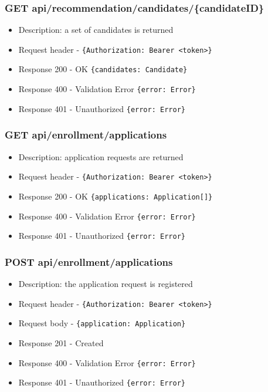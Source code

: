 \subsubsection{GET api/recommendation/candidates/\{candidateID\}}
\begin{itemize}
    \item Description: a set of candidates is returned
    \item Request header - \verb|{Authorization: Bearer <token>}|
    \item Response 200 - OK \verb|{candidates: Candidate}|
    \item Response 400 - Validation Error \verb|{error: Error}|
    \item Response 401 - Unauthorized \verb|{error: Error}|
\end{itemize}

\subsubsection{GET api/enrollment/applications}
\begin{itemize}
    \item Description: application requests are returned
    \item Request header - \verb|{Authorization: Bearer <token>}|
    \item Response 200 - OK \verb|{applications: Application[]}|
    \item Response 400 - Validation Error \verb|{error: Error}|
    \item Response 401 - Unauthorized \verb|{error: Error}|
\end{itemize}

\subsubsection{POST api/enrollment/applications}
\begin{itemize}
    \item Description: the application request is registered
    \item Request header - \verb|{Authorization: Bearer <token>}|
    \item Request body - \verb|{application: Application}|
    \item Response 201 - Created
    \item Response 400 - Validation Error \verb|{error: Error}|
    \item Response 401 - Unauthorized \verb|{error: Error}|
\end{itemize}

